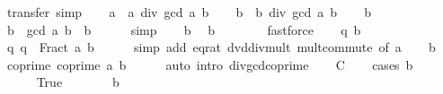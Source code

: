 \begin{isabellebody}
\ transfer\ simp\isanewline
\ \ \isamarkupfalse%
\ {\isacharquery}{\kern0pt}a\ {\isacharequal}{\kern0pt}\ {\isachardoublequoteopen}a\ div\ gcd\ a\ b{\isachardoublequoteclose}\isanewline
\ \ \isamarkupfalse%
\ {\isacharquery}{\kern0pt}b\ {\isacharequal}{\kern0pt}\ {\isachardoublequoteopen}b\ div\ gcd\ a\ b{\isachardoublequoteclose}\isanewline
\ \ \isamarkupfalse%
\ b\ \isamarkupfalse%
\ {\isachardoublequoteopen}{\isacharquery}{\kern0pt}b\ {\isacharasterisk}{\kern0pt}\ gcd\ a\ b\ {\isacharequal}{\kern0pt}\ b{\isachardoublequoteclose}\isanewline
\ \ \ \ \isamarkupfalse%
\ simp\isanewline
\ \ \isamarkupfalse%
\ b\ \isamarkupfalse%
\ {\isachardoublequoteopen}{\isacharquery}{\kern0pt}b\ {\isasymnoteq}\ {}{\isachardoublequoteclose}\isanewline
\ \ \ \ \isamarkupfalse%
\ fastforce\isanewline
\ \ \isamarkupfalse%
\ q\ b\ \isamarkupfalse%
\ q{}{\isacharcolon}{\kern0pt}\ {\isachardoublequoteopen}q\ {\isacharequal}{\kern0pt}\ Fract\ {\isacharquery}{\kern0pt}a\ {\isacharquery}{\kern0pt}b{\isachardoublequoteclose}\isanewline
\ \ \ \ \isamarkupfalse%
\ {\isacharparenleft}{\kern0pt}simp\ add{\isacharcolon}{\kern0pt}\ eq{\isacharunderscore}{\kern0pt}rat\ dvd{\isacharunderscore}{\kern0pt}div{\isacharunderscore}{\kern0pt}mult\ mult{\isachardot}{\kern0pt}commute\ {\isacharbrackleft}{\kern0pt}of\ a{\isacharbrackright}{\kern0pt}{\isacharparenright}{\kern0pt}\isanewline
\ \ \isamarkupfalse%
\ b\ \isamarkupfalse%
\ coprime{\isacharcolon}{\kern0pt}\ {\isachardoublequoteopen}coprime\ {\isacharquery}{\kern0pt}a\ {\isacharquery}{\kern0pt}b{\isachardoublequoteclose}\isanewline
\ \ \ \ \isamarkupfalse%
\ {\isacharparenleft}{\kern0pt}auto\ intro{\isacharcolon}{\kern0pt}\ div{\isacharunderscore}{\kern0pt}gcd{\isacharunderscore}{\kern0pt}coprime{\isacharparenright}{\kern0pt}\isanewline
\ \ \isamarkupfalse%
\ C\isanewline
\ \ \isamarkupfalse%
\ {\isacharparenleft}{\kern0pt}cases\ {\isachardoublequoteopen}b\ {\isachargreater}{\kern0pt}\ {}{\isachardoublequoteclose}{\isacharparenright}{\kern0pt}\isanewline
\ \ \ \ \isamarkupfalse%
\ True\isanewline
\ \ \ \ \isamarkupfalse%
\ \isamarkupfalse%
\ {\isachardoublequoteopen}{\isacharquery}{\kern0pt}b\ {\isachargreater}{\kern0pt}\ {}{\isachardoublequoteclose}\isanewline
\ \ \ \ \ \ \isamarkupfalse%

\end{isabellebody}
